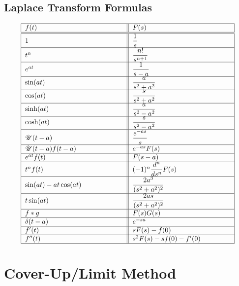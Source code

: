 \documentclass[12pt]{article}
\title{}
\date{}
\author{}
\begin{document}
\begin{center}
\section*{Laplace Transform Formulas}
\renewcommand{\arraystretch}{2}
\[
\begin{tabular}{|p{5cm}||p{5cm}|}
\hline
$f(t)$ & $F(s)$ \\
\hline\hline
$1$ & $\dfrac{1}{s}$ \\
\hline
$t^{n}$ & $\dfrac{n!}{s^{n+1}}$ \\
\hline
$e^{at}$ & $\dfrac{1}{s-a}$ \\
\hline
$\sin(at)$ & $\dfrac{a}{s^{2}+a^{2}}$ \\
\hline
$\cos(at)$ & $\dfrac{s}{s^{2}+a^{2}}$ \\
\hline
$\sinh(at)$ & $\dfrac{a}{s^{2}-a^{2}}$ \\
\hline
$\cosh(at)$ & $\dfrac{s}{s^{2}-a^{2}}$ \\
\hline
$\mathscr{U}(t-a)$ & $\dfrac{e^{-as}}{s}$ \\
\hline
$\mathscr{U}(t-a)f(t-a)$ & $e^{-as}F(s)$ \\
\hline
$e^{at}f(t)$ & $F(s-a)$ \\
\hline
$t^n f(t)$ & $(-1)^n\dfrac{d^n}{ds^n}F(s)$ \\
\hline
$\sin(at)-at\cos(at)$ & $\dfrac{2a^3}{(s^2+a^2)^2}$ \\
\hline
$t\sin(at)$ & $\dfrac{2as}{(s^2+a^2)^2}$ \\
\hline
$f * g$ & $F(s)G(s)$ \\
\hline
$\delta(t-a)$ & $e^{-sa}$ \\
\hline
$f'(t)$ & $sF(s)-f(0)$ \\
\hline
$f''(t)$ & $s^2F(s)-sf(0)-f'(0)$ \\
\hline
\end{tabular}
\]
\end{center}

\section*{Cover-Up/Limit Method}
\end{document}
